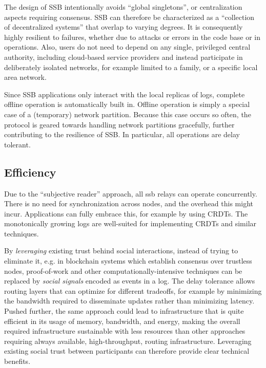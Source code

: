 \documentclass[9pt,sigconf]{acmart}
\begin{document}
The design of SSB intentionally avoids ``global singletons'', or centralization aspects requiring consensus. SSB can therefore be characterized as a ``collection of decentralized systems'' that overlap to varying degrees. It is consequently highly resilient to failures, whether due to attacks or errors in the code base or in operations. Also, users do not need to depend on any single, privileged central authority, including cloud-based service providers and instead participate in deliberately isolated networks, for example limited to a family, or a specific local area network.

Since SSB applications only interact with the local replicas of logs, complete offline operation is automatically built in. Offline operation is simply a special case of a (temporary) network partition. Because this case occurs so often, the protocol is geared towards handling network partitions gracefully, further contributing to the resilience of SSB. In particular, all operations are delay tolerant.




\subsection{Efficiency}

Due to the ``subjective reader'' approach, all ssb relays can operate concurrently. There is no need for synchronization across nodes, and the overhead this might incur. Applications can fully embrace this, for example by using CRDTs. The monotonically growing logs are well-suited for implementing CRDTs and similar techniques.

By {\em leveraging} existing trust behind social interactions, instead of trying to eliminate it, e.g. in blockchain systems which establish consensus over trustless nodes, proof-of-work and other computationally-intensive techniques can be replaced by \textit{social signals} encoded as events in a log. The delay tolerance allows routing layers that can optimize for different tradeoffs, for example by minimizing the bandwidth required to disseminate updates rather than minimizing latency. Pushed further, the same approach could lead to infrastructure that is quite efficient in its usage of memory, bandwidth, and energy, making the overall required infrastructure sustainable with less resources than other approaches requiring always available, high-throughput, routing infrastructure. Leveraging existing social trust between participants can therefore provide clear technical benefits.
\end{document}
